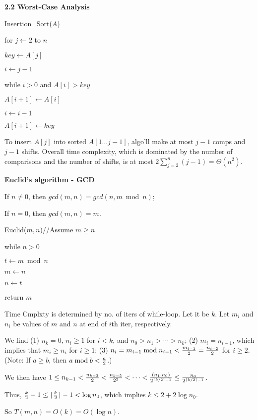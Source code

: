 

    \textbf{2.2 Worst-Case Analysis}
    
Insertion\_Sort($A$)
\par\quad for $j\leftarrow 2$ to $n$
\par\quad\quad $key\leftarrow A[j]$
\par\quad\quad $i\leftarrow j-1$
\par\quad\quad while $i>0$ and $A[i]>key$
\par\quad\quad\quad $A[i+1]\leftarrow A[i]$
\par\quad\quad\quad $i\leftarrow i-1$
\par\quad\quad $A[i+1]\leftarrow key$

To insert $A[j]$ into sorted $A[1\ldots j-1]$, algo'll make at most $j-1$ comps and $j-1$ shifts. Overall 
time complexity, which is dominated by the number of comparisons and the number of
shifts, is at most $2\sum_{j=2}^n(j-1) =\Theta(n^2)$.

\textbf{Euclid's algorithm - GCD}

If $n\not=0$, then $gcd(m,n)=gcd(n, m \bmod n)$;

If $n=0$, then $gcd(m,n)=m$.

Euclid($m,n$)\qquad //Assume $m\ge n$
\par\quad while $n>0$
\par\quad\quad $t\leftarrow m\bmod n$
\par\quad\quad $m\leftarrow n$
\par\quad\quad $n\leftarrow t$
\par\quad return $m$

Time Cmplxty is determined by no. of iters of while-loop. 
Let it be $k$. Let $m_i$ and $n_i$ be values of
$m$ and $n$ at end of $i$th iter, respectively.

We find (1) $n_k=0$, $n_i\ge 1$ for $i<k$, and 
$n_0>n_1>\cdots>n_k$; (2) $m_i=n_{i-1}$, which implies that $m_i\ge n_i$ 
for $i\ge1$; (3) $n_i=m_{i-1} \bmod n_{i-1}<{m_{i-1}\over2}={n_{i-2}\over2}$
for $i\ge2$. (Note: If $a\ge b$, then $a\bmod b<{a\over2}$.)

We then have $1\le n_{k-1}<{n_{k-3}\over2}<{n_{k-5}\over2^2}<\cdots<
{(n_1,n_0)\over2^{\lceil k/2\rceil-1}}\le {n_0\over2^{\lceil k/2\rceil-1}}$.

Thus, ${k\over2}-1\le\lceil{k\over2}\rceil-1<\log n_0$,
which implies $k\le 2+2\log n_0$.

So $T(m,n)=O(k)=O(\log n)$.



